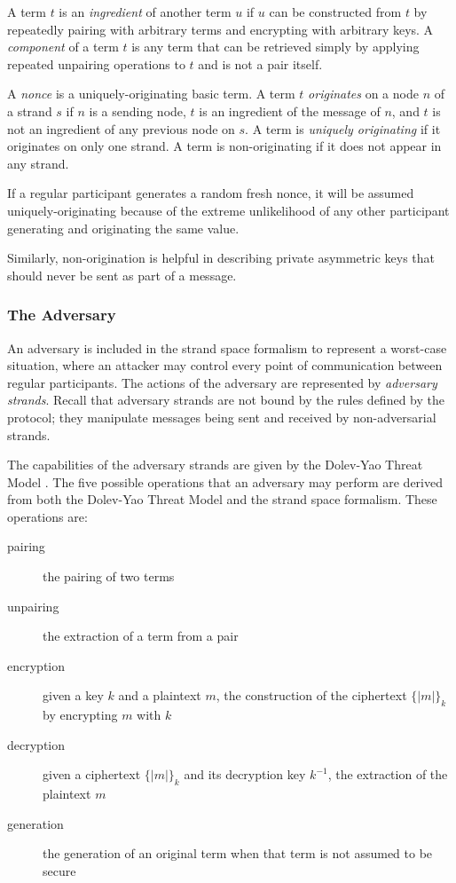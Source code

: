 			A term $t$ is an \emph{ingredient} of another term $u$ if $u$ can
			be constructed from $t$ by repeatedly pairing with arbitrary terms
			and encrypting with arbitrary keys. A \emph{component} of a term
			$t$ is any term that can be retrieved simply by applying repeated
			unpairing operations to $t$ and is not a pair itself.

			A \emph{nonce} is a uniquely-originating basic term. A term $t$
			\emph{originates} on a node $n$ of a strand $s$ if $n$ is a
			sending node, $t$ is an ingredient of the message of $n$, and
			$t$ is not an ingredient of any previous node on $s$. A term is
			\emph{uniquely originating} if it originates on only one
			strand. A term is non-originating if it does not appear in any
			strand.

			If a regular participant generates a random fresh nonce, it
			will be assumed uniquely-originating because of the extreme
			unlikelihood of any other participant generating and
			originating the same value.

			Similarly, non-origination is helpful in describing private
			asymmetric keys that should never be sent as part of a message.

		\subsubsection{The Adversary}
		\label{sec:application.the_adversary}

			An adversary is included in the strand space formalism to
			represent a worst-case situation, where an attacker may control
			every point of communication between regular participants. The
			actions of the adversary are represented by \emph{adversary
			strands}. Recall that adversary strands are not bound by the
			rules defined by the protocol; they manipulate messages being
			sent and received by non-adversarial strands.

			The capabilities of the adversary strands are given by the
			Dolev-Yao Threat Model \cite{DolevYao83}. The five possible
			operations that an adversary may perform are derived from both
			the Dolev-Yao Threat Model and the strand space formalism.
			These operations are:

			\begin{description}
			\item [pairing] the pairing of two terms
			\item [unpairing] the extraction of a term from a pair
			\item [encryption] given a key $k$ and a plaintext $m$, the construction of the ciphertext $\{|m|\}_k$ by encrypting $m$ with $k$
			\item [decryption] given a ciphertext $\{|m|\}_k$ and its decryption key $k^{-1}$, the extraction of the plaintext $m$
			\item [generation] the generation of an original term when that term is not assumed to be secure
			\end{description}

